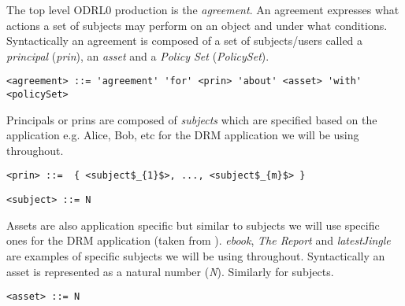 
The top level ODRL0 production is the \emph{agreement}. An agreement expresses what actions a set of subjects may perform on an object and under what conditions. Syntactically an agreement is composed of a set of subjects/users called a \emph{principal} (\emph{prin}), an \emph{asset} and a \emph{Policy Set} (\emph{PolicySet}).

\lstset{language=AST}
\begin{lstlisting}[frame=single, caption={agreement},label={lst:agreementast}]
<agreement> ::= 'agreement' 'for' <prin> 'about' <asset> 'with' <policySet> 
\end{lstlisting}

Principals or prins are composed of \emph{subjects} which are specified based on the application e.g. Alice, Bob, etc for the DRM application we will be using throughout.

\lstset{mathescape, language=AST}  
\begin{lstlisting}[frame=single, caption={prin},label={lst:prinast}]
<prin> ::=  { <subject$_{1}$>, ..., <subject$_{m}$> }
\end{lstlisting}

\lstset{mathescape, language=AST}  
\begin{lstlisting}[frame=single, caption={subject},label={lst:subjectast}]
<subject> ::= N
\end{lstlisting}

Assets are also application specific but similar to subjects we will use specific ones for the DRM application (taken from \cite{pucella2006}). \emph{ebook}, \emph{The Report} and \emph{latestJingle} are examples of specific subjects we will be using throughout. Syntactically an asset is represented as a natural number (\emph{N}). Similarly for subjects.

\lstset{mathescape, language=AST}  
\begin{lstlisting}[frame=single, caption={asset},label={lst:assetast}]
<asset> ::= N
\end{lstlisting}

